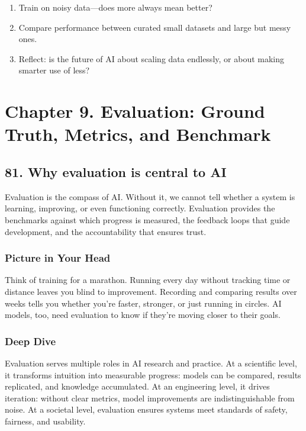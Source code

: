 \documentclass[
  letterpaper,
  DIV=11,
  numbers=noendperiod]{scrreprt}
\providecommand{\tightlist}{%
  \setlength{\itemsep}{0pt}\setlength{\parskip}{0pt}}
\begin{document}
\begin{enumerate}
\def\labelenumi{\arabic{enumi}.}
\tightlist
\item
  Train on noisy data---does more always mean better?
\item
  Compare performance between curated small datasets and large but messy
  ones.
\item
  Reflect: is the future of AI about scaling data endlessly, or about
  making smarter use of less?
\end{enumerate}

\section{Chapter 9. Evaluation: Ground Truth, Metrics, and
Benchmark}\label{chapter-9.-evaluation-ground-truth-metrics-and-benchmark}

\subsection{81. Why evaluation is central to
AI}\label{why-evaluation-is-central-to-ai}

Evaluation is the compass of AI. Without it, we cannot tell whether a
system is learning, improving, or even functioning correctly. Evaluation
provides the benchmarks against which progress is measured, the feedback
loops that guide development, and the accountability that ensures trust.

\subsubsection{Picture in Your Head}\label{picture-in-your-head-80}

Think of training for a marathon. Running every day without tracking
time or distance leaves you blind to improvement. Recording and
comparing results over weeks tells you whether you're faster, stronger,
or just running in circles. AI models, too, need evaluation to know if
they're moving closer to their goals.

\subsubsection{Deep Dive}\label{deep-dive-80}

Evaluation serves multiple roles in AI research and practice. At a
scientific level, it transforms intuition into measurable progress:
models can be compared, results replicated, and knowledge accumulated.
At an engineering level, it drives iteration: without clear metrics,
model improvements are indistinguishable from noise. At a societal
level, evaluation ensures systems meet standards of safety, fairness,
and usability.
\end{document}
